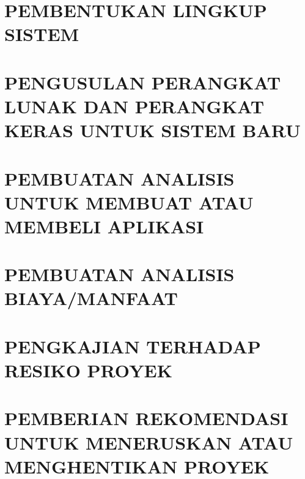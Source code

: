 \documentclass[pdftex,12pt, oneside]{article}
\begin{document}
\section{PEMBENTUKAN LINGKUP SISTEM}


\section{PENGUSULAN PERANGKAT LUNAK DAN PERANGKAT KERAS UNTUK SISTEM BARU}


\section{PEMBUATAN ANALISIS UNTUK MEMBUAT ATAU MEMBELI APLIKASI}


\section{PEMBUATAN ANALISIS BIAYA/MANFAAT}


\section{PENGKAJIAN TERHADAP RESIKO PROYEK}


\section{PEMBERIAN REKOMENDASI UNTUK MENERUSKAN ATAU MENGHENTIKAN PROYEK}
\end{document}
